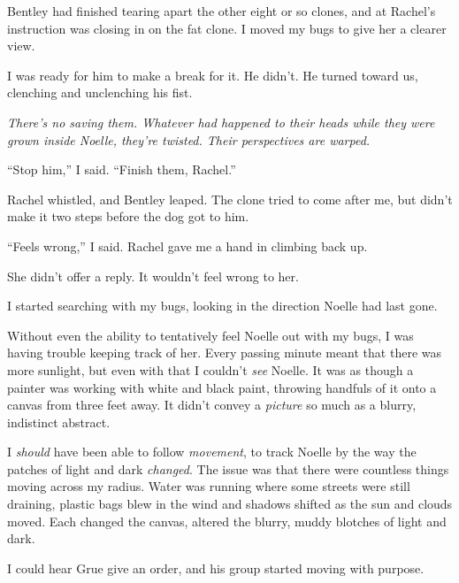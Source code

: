 Bentley had finished tearing apart the other eight or so clones, and at Rachel's instruction was closing in on the fat clone.  I moved my bugs to give her a clearer view.



I was ready for him to make a break for it.  He didn't.  He turned toward us, clenching and unclenching his fist.



\emph{There's no saving them.  Whatever had happened to their heads while they were grown inside Noelle, they're twisted.  Their perspectives are warped.}



``Stop him,'' I said.  ``Finish them, Rachel.''



Rachel whistled, and Bentley leaped.  The clone tried to come after me, but didn't make it two steps before the dog got to him.



``Feels wrong,'' I said.  Rachel gave me a hand in climbing back up.



She didn't offer a reply.  It wouldn't feel wrong to her.



I started searching with my bugs, looking in the direction Noelle had last gone.



Without even the ability to tentatively feel Noelle out with my bugs, I was having trouble keeping track of her.  Every passing minute meant that there was more sunlight, but even with that I couldn't \emph{see} Noelle.  It was as though a painter was working with white and black paint, throwing handfuls of it onto a canvas from three feet away.  It didn't convey a \emph{picture} so much as a blurry, indistinct abstract.



I \emph{should} have been able to follow \emph{movement}, to track Noelle by the way the patches of light and dark \emph{changed}.  The issue was that there were countless things moving across my radius.  Water was running where some streets were still draining, plastic bags blew in the wind and shadows shifted as the sun and clouds moved.  Each changed the canvas, altered the blurry, muddy blotches of light and dark.



I could hear Grue give an order, and his group started moving with purpose.



